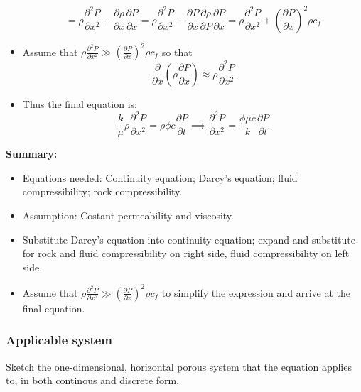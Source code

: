 \begin{itemize}
\begin{equation}
      = \rho\frac{\partial^{2}P}{\partial x^{2}}
      + \frac{\partial\rho}{\partial x}\frac{\partial P}{\partial x}
      = \rho\frac{\partial^{2}P}{\partial x^{2}}
      + \frac{\partial P}{\partial x}\frac{\partial\rho}{\partial P}\frac{\partial P}{\partial x}
      = \rho\frac{\partial^{2}P}{\partial x^{2}}
      + \left(\frac{\partial P}{\partial x}\right)^{2}\rho c_{f}
    \end{equation}
  \item Assume that $\rho\frac{\partial^{2}P}{\partial x^{2}} \gg \left(\frac{\partial P}{\partial x}\right)^{2}\rho c_{f}$ so that
    \begin{equation}
       \frac{\partial}{\partial x}\left(\rho\frac{\partial P}{\partial x}\right)
       \approx  \rho\frac{\partial^{2}P}{\partial x^{2}}
    \end{equation}
  \item Thus the final equation is:
    \begin{equation}
      \frac{k}{\mu} \rho\frac{\partial^{2}P}{\partial x^{2}} = \rho \phi c \frac{\partial P}{\partial t}
      \implies \frac{\partial^{2}P}{\partial x^{2}} = \frac{\phi \mu c}{k}\frac{\partial P}{\partial t}
    \end{equation}
\end{itemize}

\noindent \textbf{Summary:}
\begin{itemize}
  \item Equations needed: Continuity equation; Darcy's equation; fluid compressibility; rock compressibility.
  \item Assumption: Costant permeability and viscosity.
  \item Substitute Darcy's equation into continuity equation; expand and substitute for rock and fluid compressibility on right side, fluid compressibility on left side.
  \item Assume that $\rho\frac{\partial^{2}P}{\partial x^{2}} \gg \left(\frac{\partial P}{\partial x}\right)^{2}\rho c_{f}$ to simplify the expression and arrive at the final equation.
\end{itemize}



\subsubsection{Applicable system} %
\label{ssub:applicable_system}

\begin{question}
  Sketch the one-dimensional, horizontal porous system that the equation applies to, in both continous and discrete form.
\end{question}

